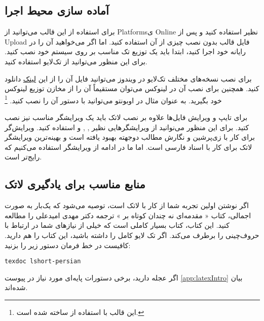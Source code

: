 \subsection{آماده سازی محیط اجرا}
برای استفاده از این قالب می‌توانید از 
\glspl{Platform}‌ی
\gls{Online}
نظیر 
استفاده کنید و پس از 
\gls{Upload}
فایل 
قالب بدون نصب چیزی از آن استفاده کنید.
اما اگر می‌خواهید آن را در رایانه خود اجرا کنید، ابتدا باید یک توزیع تک مناسب بر روی سیستم خود نصب کنید. برای این منظور می‌توانید از تک‌لایو
استفاده کنید.

برای نصب نسخه‌های مختلف تک‌لایو در ویندوز می‌توانید فایل 
آن را از این
\href{https://ftp.math.utah.edu/pub/tex/historic/systems/texlive/}{لینک}%
دانلود کنید.
همچنین برای نصب آن در لینوکس می‌توان مستقیماً آن را از مخازن توزیع لینوکس خود بگیرید. به عنوان مثال در اوبونتو می‌توانید با دستور
آن را نصب کنید. 
\footnote{
	این قالب با استفاده از
	ساخته شده است.}

برای تایپ و ویرایش فایل‌ها علاوه بر نصب لاتک باید یک ویرایشگر مناسب نیز نصب کتید. برای این منظور می‌نوانید از ویرایشگرهایی نظیر
,
,
و
استفاده کنید. ویرایش‌گر 
\href{https://bitbucket.org/srazi/biditexmaker3}{}%
برای کار با زی‌پرشین و نگارش مطالب دوجهته بهبود یافته است و بهینه‌ترین ویرایشگر لاتک برای کار با اسناد فارسی است. اما ما در ادامه از ویرایشگر 
استفاده می‌کنیم که رایج‌تر است.

\subsection{منابع مناسب برای یادگیری لاتک}
اگر نوشتن \پ اولین تجربه شما از کار با لاتک است، توصیه می‌شود که یک‌بار به صورت اجمالی، کتاب «%
مقدمه‌ای نه چندان کوتاه بر
\lr{\LaTeXe}%
»
ترجمه دکتر مهدی امیدعلی را مطالعه کنید. این کتاب، کتاب بسیار کاملی است که خیلی از نیازهای شما در ارتباط با حروف‌چینی را برطرف می‌کند.
اگر تک لایو کامل را داشته باشید، این کتاب را هم دارید. کافیست در خط فرمان دستور زیر را بزنید:
\begin{latin}
	\texttt{texdoc lshort-persian}
\end{latin}
اگر عجله دارید، برخی دستورات پایه‌ای مورد نیاز در پیوست \ref{app:latexIntro} بیان شده‌اند.


